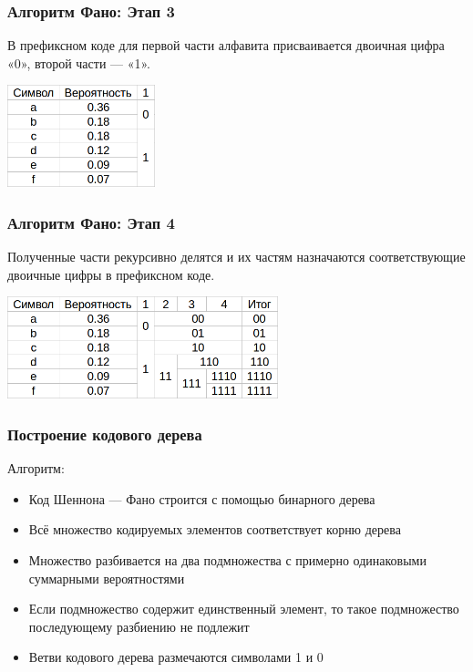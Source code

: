 \documentclass[10pt,pdf,hyperref={unicode}]{beamer}
\begin{document}
\begin{frame}
	\frametitle{Алгоритм Фано: Этап 3}
	В префиксном коде для первой части алфавита присваивается двоичная цифра «0», второй части — «1».
	\newline\newline
	\centerline{\includegraphics[height=8em]{alg2.png}}
\end{frame}

\begin{frame}
	\frametitle{Алгоритм Фано: Этап 4}
	Полученные части рекурсивно делятся и их частям назначаются соответствующие двоичные цифры в префиксном коде.
	\newline\newline
	\centerline{\includegraphics[height=8em]{alg3.png}}
\end{frame}

\begin{frame}
	\frametitle{Построение кодового дерева}
	Алгоритм:
	\begin{itemize}
		\item Код Шеннона — Фано строится с помощью бинарного дерева
		\item Всё множество кодируемых элементов соответствует корню дерева
		\item Множество разбивается на два подмножества с примерно одинаковыми суммарными вероятностями
		\item Если подмножество содержит единственный элемент, то такое подмножество последующему разбиению не подлежит
		\item Ветви кодового дерева размечаются символами 1 и 0
	\end{itemize}
\end{frame}
\end{document}
